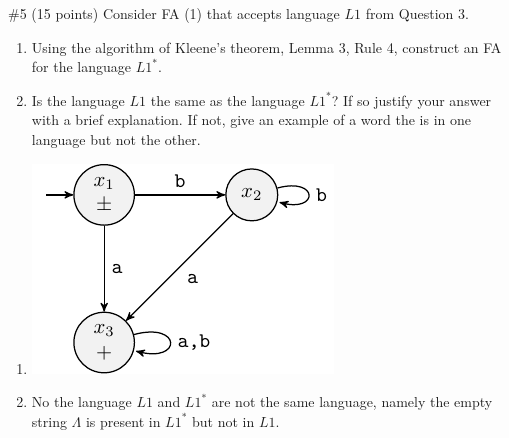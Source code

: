 \begin{problem}{\#5 (15 points)}
    Consider FA (1) that accepts language \(L1\) from Question 3.
    \begin{enumerate}[label={\bf \alph*)}]
        \item Using the algorithm of Kleene's theorem, Lemma 3, Rule 4, construct an FA for the language \(L1^*\).
        \item Is the language \(L1\) the same as the language \(L1^*\)?
        If so justify your answer with a brief explanation.
        If not, give an example of a word the is in one language but not the other.
    \end{enumerate}
\end{problem}
\vspace{2em}
\begin{solution}
    \begin{enumerate}[label={\bf \alph*)}]
        \item \includegraphics[]{figures/answer/Answer5A.pdf}
        \item No the language \(L1\) and \(L1^*\) are not the same language, namely the empty string \(\Lambda\) is present in \(L1^*\) but not in \(L1\).
    \end{enumerate}
\end{solution}

